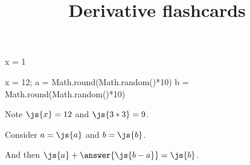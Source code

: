 \documentclass{ximera}
\title{Derivative flashcards}
\begin{document}
\begin{sagecell}
  x = 1
\end{sagecell}

\begin{javascript}
  x = 12;
  a = Math.round(Math.random()*10)
  b = Math.round(Math.random()*10)
\end{javascript}

Note $\js{x} = 12$ and $\js{3*3} = 9$.

\begin{problem}
  Consider $a = \js{a}$ and $b = \js{b}$.

  And then $\js{a} + \answer{\js{b-a}} = \js{b}$.
\end{problem}
\end{document}
